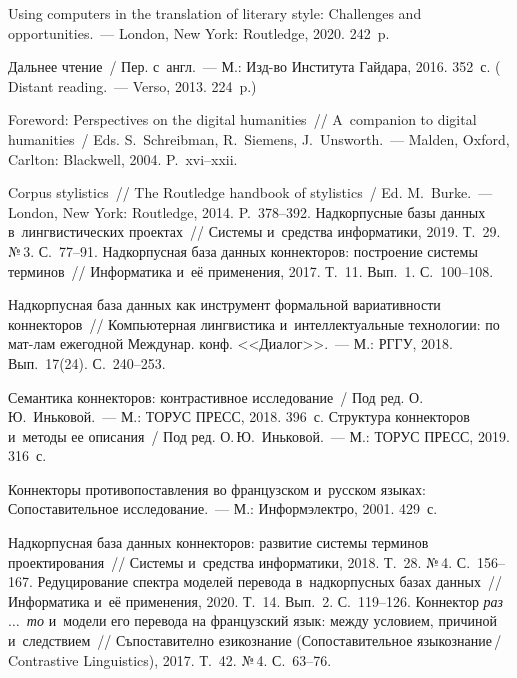 \begin{multicols}{2}
{{\begin{thebibliography}{99}
 Using computers in the translation of literary style: Challenges and 
opportunities.~--- London, New York: Routledge, 2020. 242~p.

 Дальнее чтение~/ Пер. с~англ.~--- М.: Изд-во Института Гайдара, 2016. 352~с.
(  {Distant reading}.~--- Verso, 2013. 224~p.)

 Foreword: Perspectives on the digital humanities~// A~companion to digital 
humanities~/ Eds. S.~Schreibman, R.~Siemens, J.~Unsworth.~--- Malden, Oxford, Carlton: Blackwell, 2004. P.~xvi--xxii.

 Corpus stylistics~// The Routledge handbook of stylistics~/  
Ed. M.~Burke.~--- London, New York: Routledge, 2014. P.~378--392.
 Надкорпусные базы данных 
в~лингвистических проектах~// Системы и~средства информатики, 2019. Т.~29. №\,3.  
С.~77--91.
 Надкорпусная база данных 
коннекторов: построение системы терминов~// Информатика и~её применения, 2017. 
Т.~11. Вып.~1. С.~100--108.

 Надкорпусная база данных как инструмент формальной 
вариативности коннекторов~// Компьютерная лингвистика и~интеллектуальные 
технологии: по мат-лам ежегодной Междунар. конф. <<Диалог>>.~--- М.: РГГУ, 2018. 
Вып.~17(24). С.~240--253.


Семантика коннекторов: контрастивное исследование~/ Под ред. О.\,Ю.~Иньковой.~--- 
М.: ТОРУС ПРЕСС, 2018. 396~с.
Структура коннекторов и~методы ее описания~/ Под ред. О.\,Ю.~Иньковой.~--- М.: 
ТОРУС ПРЕСС, 2019. 316~с.

 Коннекторы противопоставления во французском 
и~русском языках: Сопоставительное исследование.~--- М.: Информэлектро, 2001. 429~с.


 Надкорпусная база данных коннекторов: развитие 
системы терминов проектирования~// Системы и~средства информатики, 2018. Т.~28. 
№\,4. С.~156--167.
 Редуцирование спектра моделей перевода 
в~надкорпусных базах данных~// Информатика и~её применения, 2020. Т.~14. Вып.~2.  
С.~119--126.
 Коннектор \textit{раз$\ldots$\ то} и~модели его перевода на французский 
язык: между условием, причиной и~следствием~// Съпоставително езикознание 
(Сопоставительное языкознание\,/\,Contrastive Linguistics), 2017. Т.~42. №\,4. С.~63--76.
\end{thebibliography}

 }
 }

\end{multicols}

